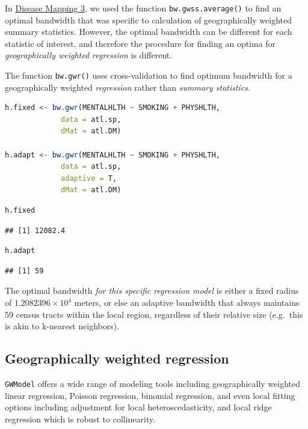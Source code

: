 \documentclass[
]{book}
\newcommand{\passthrough}[1]{#1}
\begin{document}
In \protect\hyperlink{gwss}{Disease Mapping 3}, we used the function \passthrough{\lstinline!bw.gwss.average()!} to find an optimal bandwidth that was specific to calculation of geographically weighted summary statistics. However, the optimal bandwidth can be different for each statistic of interest, and therefore the procedure for finding an optima for \emph{geographically weighted regression} is different.

The function \passthrough{\lstinline!bw.gwr()!} uses cross-validation to find optimum bandwidth for a geographically weighted \emph{regression} rather than \emph{summary statistics}.

\begin{lstlisting}[language=R]
h.fixed <- bw.gwr(MENTALHLTH ~ SMOKING + PHYSHLTH, 
             data = atl.sp, 
             dMat = atl.DM)

h.adapt <- bw.gwr(MENTALHLTH ~ SMOKING + PHYSHLTH, 
             data = atl.sp, 
             adaptive = T,
             dMat = atl.DM)
\end{lstlisting}

\begin{lstlisting}[language=R]
h.fixed
\end{lstlisting}

\begin{lstlisting}
## [1] 12082.4
\end{lstlisting}

\begin{lstlisting}[language=R]
h.adapt
\end{lstlisting}

\begin{lstlisting}
## [1] 59
\end{lstlisting}

The optimal bandwidth \emph{for this specific regression model} is either a fixed radius of \ensuremath{1.2082396\times 10^{4}} meters, or else an adaptive bandwidth that always maintains 59 census tracts within the local region, regardless of their relative size (e.g.~this is akin to k-nearest neighbors).

\hypertarget{geographically-weighted-regression}{%
\subsection{Geographically weighted regression}\label{geographically-weighted-regression}}

\passthrough{\lstinline!GWModel!} offers a wide range of modeling tools including geographically weighted linear regression, Poisson regression, binomial regression, and even local fitting options including adjustment for local heteroscedasticity, and local ridge regression which is robust to collinearity.
\end{document}
